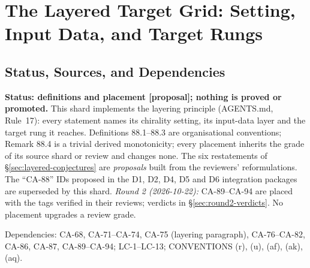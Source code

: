 
\section{The Layered Target Grid: Setting, Input Data, and Target Rungs}
\label{sec:layered-targets}

\subsection{Status, Sources, and Dependencies}

\textbf{Status: definitions and placement [proposal]; nothing is proved or promoted.}  This shard implements the
layering principle (AGENTS.md, Rule~17): every statement names its chirality setting, its input-data layer and the
target rung it reaches.  Definitions 88.1--88.3 are organisational conventions; Remark 88.4 is a trivial derived
monotonicity; every placement inherits the grade of its source shard or review and changes none.  The six
restatements of \S\ref{sec:layered-conjectures} are \emph{proposals} built from the reviewers' reformulations.
The ``CA-88'' IDs proposed in the D1, D2, D4, D5 and D6 integration packages are superseded by this shard.
\emph{Round 2 (2026-10-22):} CA-89--CA-94 are placed with the tags verified in their reviews; verdicts in
\S\ref{sec:round2-verdicts}.  No placement upgrades a review grade.

Dependencies: CA-68, CA-71--CA-74, CA-75 (layering paragraph), CA-76--CA-82, CA-86, CA-87, CA-89--CA-94; LC-1--LC-13;
CONVENTIONS (r), (u), (af), (ak), (aq).

